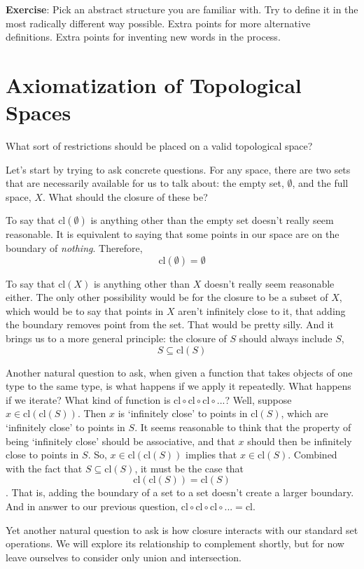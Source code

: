 \documentclass{report}
\newcommand{\cl}{\mathrm{cl}}
\begin{document}
{\bf Exercise}: Pick an abstract structure you are familiar with. Try to define it in the most radically different way possible. Extra points for more alternative definitions. Extra points for inventing new words in the process.

\section{Axiomatization of Topological Spaces}

What sort of restrictions should be placed on a valid topological space?

Let's start by trying to ask concrete questions. For any space, there are two sets that are necessarily available for us to talk about: the empty set, $∅$, and the full space, $X$. What should the closure of these be?

To say that $\cl(∅)$ is anything other than the empty set doesn't really seem reasonable. It is equivalent to saying that some points in our space are on the boundary of \emph{nothing}. Therefore, $$\cl(∅) = ∅$$

To say that $\cl(X)$ is anything other than $X$ doesn't really seem reasonable either. The only other possibility would be for the closure to be a subset of $X$, which would be to say that points in $X$ aren't infinitely close to it, that adding the boundary removes point from the set. That would be pretty silly. And it brings us to a more general principle: the closure of $S$ should always include $S$, $$S ⊆ \cl(S)$$

Another natural question to ask, when given a function that takes objects of one type to the same type, is what happens if we apply it repeatedly. What happens if we iterate? What kind of function is $\cl ∘ \cl ∘ \cl ∘ ...$? Well, suppose $x ∈ \cl(\cl(S))$. Then $x$ is `infinitely close' to points in $\cl(S)$, which are `infinitely close' to points in $S$. It seems reasonable to think that the property of being `infinitely close' should be associative, and that $x$ should then be infinitely close to points in $S$. So, $x ∈ \cl(\cl(S))$ implies that $x ∈ \cl(S)$. Combined with the fact that $S ⊆ \cl(S)$, it must be the case that $$\cl(\cl(S)) = \cl(S)$$. That is, adding the boundary of a set to a set doesn't create a larger boundary. And in answer to our previous question, $\cl ∘ \cl ∘ \cl ∘ ... = \cl$.

Yet another natural question to ask is how closure interacts with our standard set operations. We will explore its relationship to complement shortly, but for now leave ourselves to consider only union and intersection.
\end{document}
